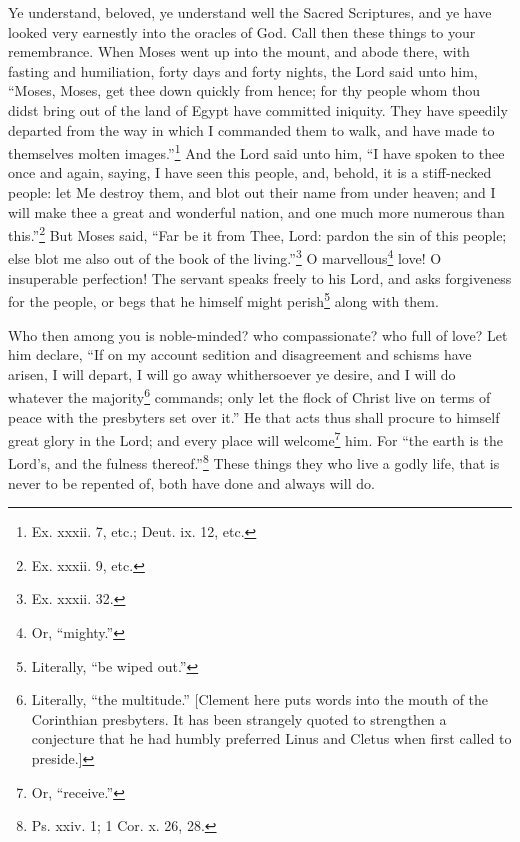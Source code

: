 Ye understand, beloved, ye understand well the Sacred Scriptures, and ye have looked very earnestly into the oracles of God. Call then these things to your remembrance. When Moses went up into the mount, and abode there, with fasting and humiliation, forty days and forty nights, the Lord said unto him, “Moses, Moses, get thee down quickly from hence; for thy people whom thou didst bring out of the land of Egypt have committed iniquity. They have speedily departed from the way in which I commanded them to walk, and have made to themselves molten images.”\footnote{Ex. xxxii. 7, etc.; Deut. ix. 12, etc.} And the Lord said unto him, “I have spoken to thee once and again, saying, I have seen this people, and, behold, it is a stiff-necked people: let Me destroy them, and blot out their name from under heaven; and I will make thee a great and wonderful nation, and one much more numerous than this.”\footnote{Ex. xxxii. 9, etc.} But Moses said, “Far be it from Thee, Lord: pardon the sin of this people; else blot me also out of the book of the living.”\footnote{Ex. xxxii. 32.} O marvellous\footnote{Or, “mighty.”} love! O insuperable perfection! The servant speaks freely to his Lord, and asks forgiveness for the people, or begs that he himself might perish\footnote{Literally, “be wiped out.”} along with them.


Who then among you is noble-minded? who compassionate? who full of love? Let him declare, “If on my account sedition and disagreement and schisms have arisen, I will depart, I will go away whithersoever ye desire, and I will do whatever the majority\footnote{Literally, “the multitude.” [Clement here puts words into the mouth of the Corinthian presbyters. It has been strangely quoted to strengthen a conjecture that he had humbly preferred Linus and Cletus when first called to preside.]} commands; only let the flock of Christ live on terms of peace with the presbyters set over it.” He that acts thus shall procure to himself great glory in the Lord; and every place will welcome\footnote{Or, “receive.”} him. For “the earth is the Lord’s, and the fulness thereof.”\footnote{Ps. xxiv. 1; 1 Cor. x. 26, 28.} These things they who live a godly life, that is never to be repented of, both have done and always will do.


